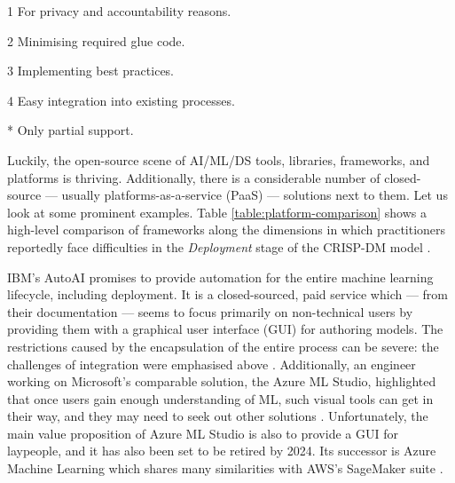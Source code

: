 \begin{table}[H]
\begin{threeparttable}
\begin{tablenotes}
\item[1] For privacy and accountability reasons. \cite{bosch2021engineering}
\item[2] Minimising required glue code. \cite{sculley2015hidden}
\item[3] Implementing best practices. \cite{serban2020adoption,serban2021practices,john2020architecting}
\item[4] Easy integration into existing processes. \cite{haakman2021ai,thiee2021systematic}
\item[*] Only partial support.
\end{tablenotes}
\end{threeparttable}
\end{table}

Luckily, the open-source scene of AI/ML/DS tools, libraries, frameworks, and platforms is thriving. Additionally, there is a considerable number of closed-source --- usually platforms-as-a-service (PaaS) --- solutions next to them. Let us look at some prominent examples. Table \ref{table:platform-comparison} shows a high-level comparison of frameworks along the dimensions in which practitioners reportedly face difficulties in the \textit{Deployment} stage of the CRISP-DM model \cite{wirth2000crisp}.

IBM's AutoAI \cite{wang2020autoai} promises to provide automation for the entire machine learning lifecycle, including deployment. It is a closed-sourced, paid service which --- from their documentation --- seems to focus primarily on non-technical users by providing them with a graphical user interface (GUI) for authoring models. The restrictions caused by the encapsulation of the entire process can be severe: the challenges of integration were emphasised above \cite{sculley2015hidden}. Additionally, an engineer working on Microsoft's comparable solution, the Azure ML Studio, highlighted that once users gain enough understanding of ML, such visual tools can get in their way, and they may need to seek out other solutions \cite{amershi2019software}. Unfortunately, the main value proposition of Azure ML Studio is also to provide a GUI for laypeople, and it has also been set to be retired by 2024. Its successor is Azure Machine Learning which shares many similarities with AWS's SageMaker suite \cite{joshi2020amazon}.

